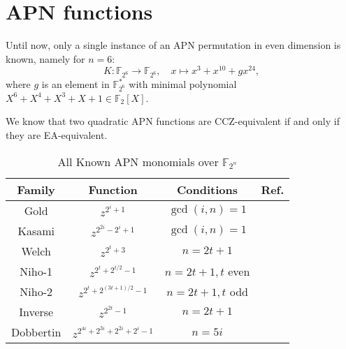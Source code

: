 \documentclass[12pt,a4paper]{ctexbook}
\newcommand{\0}{\textbf{0}}
\newcommand{\1}{\textbf{1}}
\newcommand{\F}{\mathbb{F}}
\begin{document}
\section{APN functions}
    Until now, only a single instance of an APN permutation in even dimension is known, namely for $ n = 6 $\cite{Browning2010sixbitAPN}: 
    \[K:\F_{2^6}\rightarrow\F_{2^6},\quad x\mapsto x^3+x^{10}+gx^{24},\]
    where $ g $ is an element in $ \F_{2^6}^* $ with minimal polynomial $ X^6+X^4+X^3 + X + 1\in \F_2[X] $. 

    We know that two quadratic APN functions are CCZ-equivalent if and only if they are EA-equivalent\cite{Yoshiara2012EAeqCCZ_quadAPN}.

    \begin{table}[!t]
        \caption{All Known APN monomials over $\F_{2^n}$} \label{APN monomials}
        \centering
        \small
        \begin{tabular}{c c cc }	
            \toprule
            Family   &	Function                       & Conditions        & Ref. \\
            \midrule
            Gold     &$ z^{2^i+1}$                     & $ \gcd(i,n)=1$    &  \cite{Gold1968goldfunction_APN_sequences} \\
            Kasami   &$ z^{2^{2i}-2^i+1}$              & $ \gcd(i,n)=1$    &  \cite{Kasami1971kasamifunction_APN_sequences} \\
            Welch    &$ z^{2^t+3}$                     & $ n=2t+1$         &  \cite{Dobbertin1999Welchfunction_APN_sequences} \\
            Niho-1   &$ z^{2^t+2^{t/2}-1}$             & $ n=2t+1, t$ even &  \cite{Dobbertin1999Nihofunction_APN_sequences} \\
            Niho-2   &$ z^{2^t+2^{(3t+1)/2}-1}$        & $ n=2t+1, t$ odd  &  \cite{Dobbertin1999Nihofunction_APN_sequences} \\
            Inverse  &$ z^{2^{2t}-1} $                 & $ n=2t+1$         &  \cite{Nyberg1993differential_and_inversefunction} \\
            Dobbertin&$ z^{2^{4i}+2^{3i}+2^{2i}+2^i-1}$& $ n=5i$           & \cite{Dobbertin2001dobbbertinAPN} \\
            \bottomrule
        \end{tabular}
    \end{table}
\end{document}
